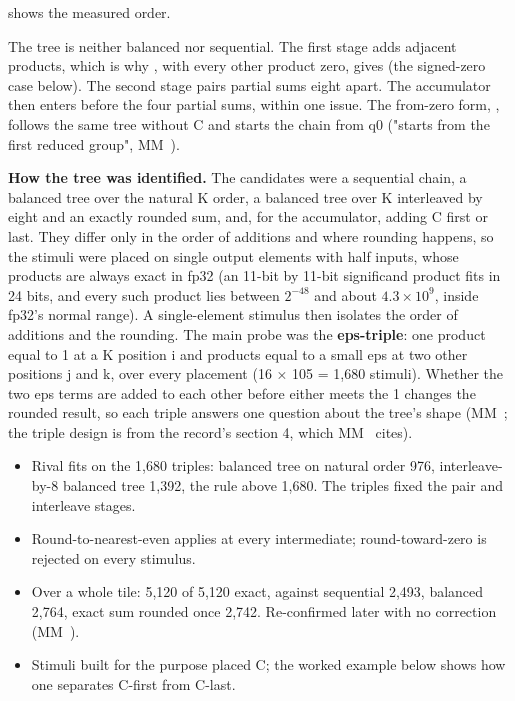  shows the measured order.



The tree is neither balanced nor sequential. The first stage adds adjacent products, which is why , with every
other product zero, gives  (the signed-zero case below). The second stage pairs partial sums eight apart. The
accumulator then enters before the four partial sums, within one issue. The from-zero form, , follows the same tree without C and starts the chain from q0 ("starts from the first reduced
group", MM~).

\textbf{How the tree was identified.} The candidates were a sequential chain, a balanced tree over the natural K order, a
balanced tree over K interleaved by eight and an exactly rounded sum, and, for the accumulator, adding C first or last.
They differ only in the order of additions and where rounding happens, so the stimuli were placed on single output elements
with half inputs, whose products are always exact in fp32 (an 11-bit by 11-bit significand product fits in 24 bits, and
every such product lies between $2^{-48}$ and about $4.3 \times 10^{9}$, inside fp32's normal range). A single-element
stimulus then isolates the order of additions and the rounding. The main probe was the \textbf{eps-triple}: one product
equal to 1 at a K position i and products equal to a small eps at two other positions j and k, over every placement
(16 × 105 = 1,680 stimuli). Whether the two eps terms are added to each other before either meets the 1 changes the
rounded result, so each triple answers one question about the tree's shape (MM~; the triple design is from the
record's section 4, which MM~ cites).

\begin{itemize}
\item Rival fits on the 1,680 triples: balanced tree on natural order 976, interleave-by-8 balanced tree 1,392, the rule
  above 1,680. The triples fixed the pair and interleave stages.
\item Round-to-nearest-even applies at every intermediate; round-toward-zero is rejected on every stimulus.
\item Over a whole tile: 5,120 of 5,120 exact, against sequential 2,493, balanced 2,764, exact sum rounded
  once 2,742. Re-confirmed later with no correction (MM~).
\item Stimuli built for the purpose placed C; the worked example below shows how one separates C-first from C-last.
\end{itemize}

